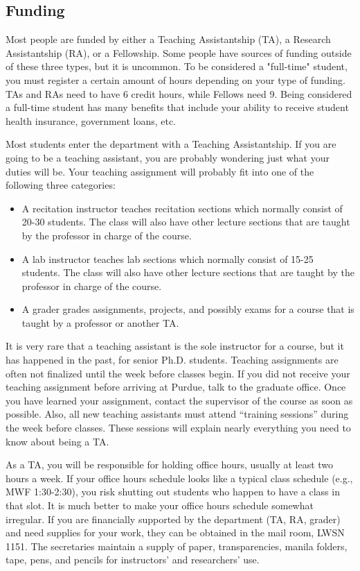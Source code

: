 \subsection{Funding}

Most people are funded by either a Teaching Assistantship (TA), a Research Assistantship (RA), or a Fellowship. Some people have sources of funding outside of these three types, but it is uncommon. To be considered a "full-time" student, you must register a certain amount of hours depending on your type of funding. TAs and RAs need to have 6 credit hours, while Fellows need 9. Being considered a full-time student has many benefits that include your ability to receive student health insurance, government loans, etc.

Most students enter the department with a Teaching Assistantship. If you are going to be a teaching assistant, you are probably wondering just what your duties will be. Your teaching assignment will probably fit into one of the following three categories:

\begin{itemize}
	\item A recitation instructor teaches recitation sections which normally consist of 20-30 students. The class will also have other lecture sections that are taught by the professor in charge of the course.
	\item A lab instructor teaches lab sections which normally consist of 15-25 students. The class will also have other lecture sections that are taught by the professor in charge of the course.
	\item A grader grades assignments, projects, and possibly exams for a course that is taught by a professor or another TA.
\end{itemize}

It is very rare that a teaching assistant is the sole instructor for a course, but it has happened in the past, for senior Ph.D. students. Teaching assignments are often not finalized until the week before classes begin. If you did not receive your teaching assignment before arriving at Purdue, talk to the graduate office. Once you have learned your assignment, contact the supervisor of the course as soon as possible. Also, all new teaching assistants must attend ``training sessions'' during the week before classes. These sessions will explain nearly everything you need to know about being a TA.

As a TA, you will be responsible for holding office hours, usually at least two hours a week. If your office hours schedule looks like a typical class schedule (e.g., MWF 1:30-2:30), you risk shutting out students who happen to have a class in that slot. It is much better to make your office hours schedule somewhat irregular. If you are financially supported by the department (TA, RA, grader) and need supplies for your work, they can be obtained in the mail room, LWSN 1151. The secretaries maintain a supply of paper, transparencies, manila folders, tape, pens, and pencils for instructors' and researchers' use.

